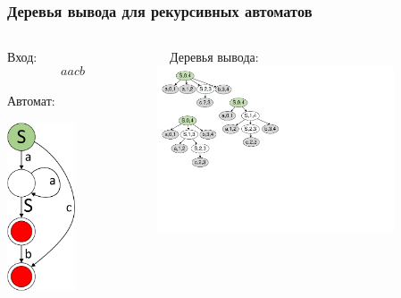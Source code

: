 \documentclass{beamer}
\begin{document}
	\begin{frame} 
		\frametitle{Деревья вывода для рекурсивных автоматов}
		\begin{columns}
			\begin{column}{3.7cm}
				Вход: $$aacb$$ \\
				\vspace{10pt}
				Автомат: \\
				\vspace{5pt}
				\begin{center}
					\includegraphics[width=2cm]{pictures/G0minimizedAutomaton.pdf}
				\end{center}
			\end{column}
		
     		\begin{column}{6cm}
     			\ \ Деревья вывода:\\
     			\vspace{5pt}
     			\includegraphics[width=7cm]{pictures/G0trees.pdf}
			\end{column}
		
		\end{columns}
	\end{frame}
	
\end{document}
